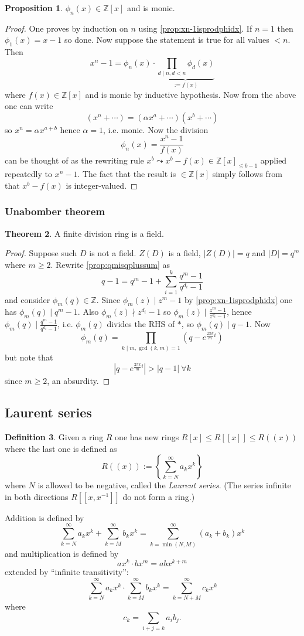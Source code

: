 \documentclass[a4paper]{article}
\newcommand{\Z}{\mathbb{Z}}
\theoremstyle{definition}
\newtheorem{defn}{Definition}[subsection]
\newtheorem{prop}[defn]{Proposition}
\newtheorem{thm}[defn]{Theorem}
\begin{document}
\begin{prop}
$\phi_n(x)\in\Z[x]$ and is monic.
\end{prop}
\begin{proof}
One proves by induction on $n$ using \ref{prop:xn-1isprodphidx}. If $n=1$ then $\phi_1(x)=x-1$ so done. Now suppose the statement is true for all values $<n$. Then
\[
x^n-1=\phi_n(x)\cdot \underbrace{\prod_{d\mid n,d<n} \phi_d(x)}_{:=f(x)}
\]
where $f(x)\in\Z[x]$ and is monic by inductive hypothesis. Now from the above one can write
\[
(x^n+\cdots)=(\alpha x^a+\cdots)(x^b+\cdots)
\]
so $x^n=\alpha x^{a+b}$ hence $\alpha=1$, i.e. monic. Now the division
\[
\phi_n(x)=\frac{x^n-1}{f(x)}
\]
can be thought of as the rewriting rule $x^b\leadsto x^b-f(x)\in\Z[x]_{\leq b-1}$ applied repeatedly to $x^n-1$. The fact that the result is $\in\Z[x]$ simply follows from that $x^b-f(x)$ is integer-valued.
\end{proof}

\subsubsection{Unabomber theorem}

\begin{thm}
A finite division ring is a field.
\end{thm}
\begin{proof}
Suppose such $D$ is not a field. $Z(D)$ is a field, $|Z(D)|=q$ and $|D|=q^m$ where $m\geq 2$. Rewrite \ref{prop:qmisqplussum} as
\[
\tag{$\ast$}
q-1=q^m-1+\sum_{i=1}^k\frac{q^m-1}{q^{d_i}-1}
\]
and consider $\phi_m(q)\in\Z$. Since $\phi_m(z)\mid z^m-1$ by \ref{prop:xn-1isprodphidx} one has $\phi_m(q)\mid q^m-1$. Also $\phi_m(z)\nmid z^{d_i}-1$ so $\phi_m(z)\mid\frac{z^m-1}{z^{d_i}-1}$, hence $\phi_m(q)\mid\frac{q^m-1}{q^{d_i}-1}$, i.e. $\phi_m(q)$ divides the RHS of $\ast$, so $\phi_m(q)\mid q-1$. Now
\[
\phi_m(q)=\prod_{k\mid m,\gcd(k,m)=1}\left(q-e^{\frac{2\pi k}{m}i}\right)
\]
but note that
\[
\left|q-e^{\frac{2\pi k}{m}i}\right|>|q-1| \ \forall k
\]
since $m\geq 2$, an absurdity.
\end{proof}

\subsection{Laurent series}
\begin{defn}
Given a ring $R$ one has new rings $R[x]\leq R[[x]]\leq R((x))$ where the last one is defined as
\[
R((x)):=\left\{ \sum_{k=N}^\infty a_k x^k \right\}
\]
where $N$ is allowed to be negative, called the \textit{Laurent series}. (The series infinite in both directions $R[[x,x^{-1}]]$ do not form a ring.)

Addition is defined by
\[
\sum_{k=N}^\infty a_k x^k+\sum_{k=M}^\infty b_k x^k=\sum_{k=\min(N,M)}^\infty (a_k+b_k)x^k
\]
and multiplication is defined by
\[
ax^k\cdot bx^m=abx^{k+m}
\]
extended by ``infinite transitivity'':
\[
\sum_{k=N}^\infty a_k x^k \cdot \sum_{k=M}^\infty b_k x^k=\sum_{k=N+M}^\infty c_k x^k
\]
where
\[
c_k=\sum_{i+j=k}a_ib_j.
\]
\end{defn}
\end{document}
